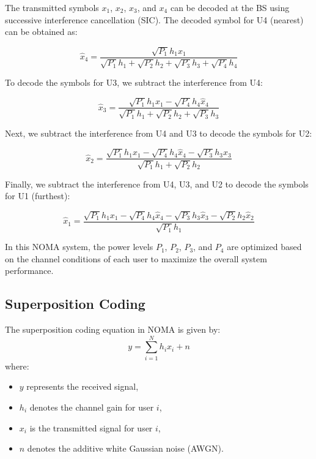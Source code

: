 \documentclass[conference]{IEEEtran}
\begin{document}
The transmitted symbols $x_1$, $x_2$, $x_3$, and $x_4$ can be decoded at the BS using successive interference cancellation (SIC). The decoded symbol for U4 (nearest) can be obtained as:

\begin{equation*}
\hat{x}_4 = \frac{\sqrt{P_1} h_1 x_1}{\sqrt{P_1} h_1 + \sqrt{P_2} h_2 + \sqrt{P_3} h_3 + \sqrt{P_4} h_4}
\end{equation*}

To decode the symbols for U3, we subtract the interference from U4:

\begin{equation*}
\hat{x}_3 = \frac{\sqrt{P_1} h_1 x_1 - \sqrt{P_4} h_4 \hat{x}_4}{\sqrt{P_1} h_1 + \sqrt{P_2} h_2 + \sqrt{P_3} h_3}
\end{equation*}

Next, we subtract the interference from U4 and U3 to decode the symbols for U2:

\begin{equation*}
\hat{x}_2 = \frac{\sqrt{P_1} h_1 x_1 - \sqrt{P_4} h_4 \hat{x}_4 - \sqrt{P_3} h_3 \hat{x}_3}{\sqrt{P_1} h_1 + \sqrt{P_2} h_2}
\end{equation*}

Finally, we subtract the interference from U4, U3, and U2 to decode the symbols for U1 (furthest):

\begin{equation*}
\hat{x}_1 = \frac{\sqrt{P_1} h_1 x_1 - \sqrt{P_4} h_4 \hat{x}_4 - \sqrt{P_3} h_3 \hat{x}_3 - \sqrt{P_2} h_2 \hat{x}_2}{\sqrt{P_1} h_1}
\end{equation*}

In this NOMA system, the power levels $P_1$, $P_2$, $P_3$, and $P_4$ are optimized based on the channel conditions of each user to maximize the overall system performance.

\subsection{Superposition Coding}
The superposition coding equation in NOMA is given by:
$$
y = \sum_{i=1}^{N} h_i x_i + n
$$
where:
\begin{itemize}
  \item $y$ represents the received signal,
  \item $h_i$ denotes the channel gain for user $i$,
  \item $x_i$ is the transmitted signal for user $i$,
  \item $n$ denotes the additive white Gaussian noise (AWGN).
\end{itemize}
\end{document}
